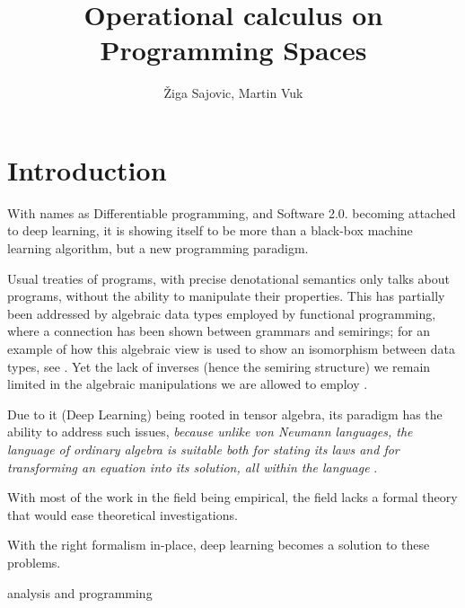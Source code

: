 
\title{Operational calculus on Programming Spaces}
\author{\v{Z}iga Sajovic, Martin Vuk}


\maketitle

\section{Introduction}


With names as Differentiable programming, and Software 2.0. becoming attached to deep learning, it is showing itself to be more than a black-box machine learning algorithm, but a new programming paradigm.

Usual treaties of programs, with precise denotational semantics only talks about programs, without the ability to manipulate their properties. This has partially been addressed by algebraic data types employed by functional programming, where a connection has been shown between grammars and semirings; for an example of how this algebraic view is used to show an isomorphism between data types, see \cite{7Trees}. Yet the lack of inverses (hence the semiring structure) we remain limited in the algebraic manipulations we are allowed to employ \cite{complexCat}.

Due to it (Deep Learning) being rooted in tensor algebra, its paradigm has the ability to address such issues, \emph{because unlike von Neumann languages, the language of ordinary algebra is suitable both for stating its laws and for transforming
an equation into its solution, all within the language} \cite{backus}.

With most of the work in the field being empirical, the field lacks a formal theory that would ease theoretical investigations.

With the right formalism in-place, deep learning becomes a solution to these problems.

analysis and programming

\printbibliography

